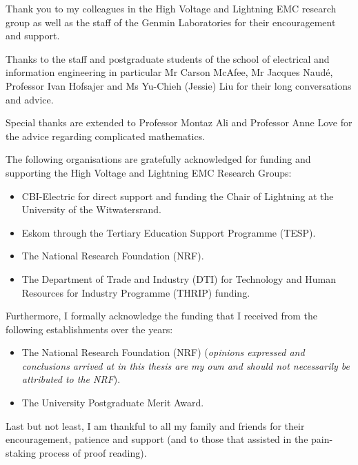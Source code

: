 \documentclass[11pt, a4paper, oneside]{Thesis} %
\begin{document}
{{Thank you to my colleagues in the High Voltage and Lightning EMC research group as well as the staff of the Genmin Laboratories for their encouragement and support.

Thanks to the staff and postgraduate students of the school of electrical and information engineering in particular Mr Carson McAfee, Mr Jacques Naud\'e, Professor Ivan Hofsajer and Ms Yu-Chieh (Jessie) Liu for their long conversations and advice.

Special thanks are extended to Professor Montaz Ali and Professor Anne Love for the advice regarding complicated mathematics.

The following organisations are gratefully acknowledged for funding and supporting the High Voltage and Lightning EMC Research Groups:
\begin{itemize}
    \item CBI-Electric for direct support and funding the Chair of Lightning at the University of the Witwatersrand.
    \item Eskom through the Tertiary Education Support Programme (TESP).
    \item The National Research Foundation (NRF).
    \item The Department of Trade and Industry (DTI) for Technology and Human Resources for Industry Programme (THRIP) funding.
\end{itemize}

Furthermore, I formally acknowledge the funding that I received from the following establishments over the years:
\begin{itemize}
    \item The National Research Foundation (NRF) (\textit{opinions expressed and conclusions arrived at in this thesis are my own and should not necessarily be attributed to the NRF}).
    \item The University Postgraduate Merit Award.
\end{itemize}

Last but not least, I am thankful to all my family and friends for their encouragement, patience and support (and to those that assisted in the pain-staking process of proof reading).
}
\clearpage %


\pagestyle{fancy} %

}
\end{document}
